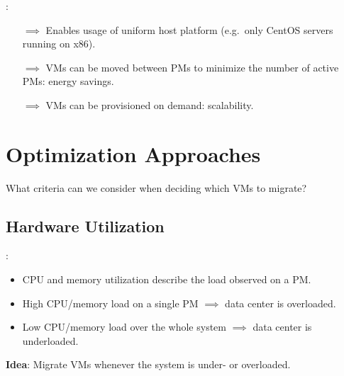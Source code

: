 \documentclass[aspectratio=169]{beamer}
\begin{document}

\begin{frame}{\insertsectionhead: \insertsubsectionhead}
    \begin{itemize}
        \item [\(\implies\)]
            Enables usage of uniform host platform (e.g.\ only CentOS servers running on x86).

        \item [\(\implies\)]
            VMs can be moved between PMs to minimize the number of active PMs: \alert{energy savings}.

        \item [\(\implies\)]
            VMs can be provisioned on demand: \alert{scalability}.
    \end{itemize}
\end{frame}

\section{Optimization Approaches}


\begin{frame}{\insertsectionhead}
    \centering
    \large
    What criteria can we consider when deciding which VMs to migrate?
\end{frame}


\subsection{Hardware Utilization}


\begin{frame}{\insertsectionhead: \insertsubsectionhead}
    \begin{itemize}
        \item
            CPU and memory utilization describe the load observed on a PM.

        \item
            High CPU/memory load on a single PM \(\implies\) data center is \alert{overloaded}.

        \item
            Low CPU/memory load over the whole system \(\implies\) data center is \alert{underloaded}.
    \end{itemize}

    \vfill
    \centering
    \textbf{Idea}: Migrate VMs whenever the system is under- or overloaded.
\end{frame}
\end{document}
